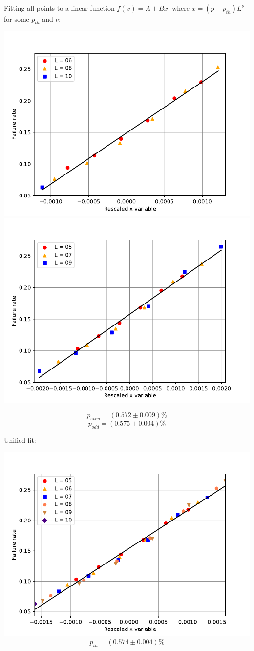 \documentclass[pra]{revtex4-1}
\begin{document}
\noindent Fitting all points to a linear function $f(x) = A + Bx$, where $x=(p-p_{th})L^{\nu}$ for some $p_{th}$ and $\nu$: 
  
\includegraphics[width=.49\textwidth]{../graphs-paper2/tph-dephasing-even-rescaled.pdf}
\includegraphics[width=.49\textwidth]{../graphs-paper2/tph-dephasing-odd-rescaled.pdf}

\[  p_{even} = (0.572 \pm 0.009)\% \]
\[  p_{odd} = (0.575 \pm 0.004)\% \]
\clearpage 

Unified fit: \begin{center} 

\includegraphics[width=.9\textwidth]{../graphs-paper2/tph-dephasing-rescaled.pdf}
\[  p_{th} = (0.574 \pm 0.004)\% \] \end{center}
\clearpage 
\end{document}
